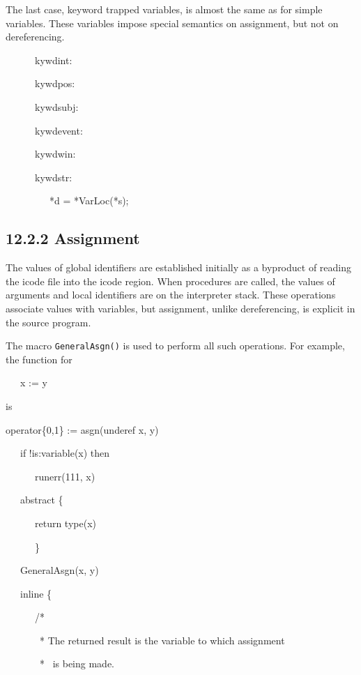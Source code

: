 The last case, keyword trapped variables, is almost the same as for
simple variables. These variables impose special semantics on
assignment, but not on dereferencing.

{\ttfamily\mdseries
\ \ \ \ \ \ kywdint:}

{\ttfamily\mdseries
\ \ \ \ \ \ kywdpos:}

{\ttfamily\mdseries
\ \ \ \ \ \ kywdsubj:}

{\ttfamily\mdseries
\ \ \ \ \ \ kywdevent:}

{\ttfamily\mdseries
\ \ \ \ \ \ kywdwin:}

{\ttfamily\mdseries
\ \ \ \ \ \ kywdstr:}


\ \ \ \ \ \ \ \ \ *d = *VarLoc(*s);

\subsection[12.2.2 Assignment]{12.2.2 Assignment}

The values of global identifiers are established initially as a
byproduct of reading the icode file into the icode region. When
procedures are called, the values of arguments and local identifiers
are on the interpreter stack. These operations associate values with
variables, but assignment, unlike dereferencing, is explicit in the
source program.


The macro \texttt{GeneralAsgn()} is used to perform all such
operations. For example, the function for

{\ttfamily\mdseries
\ \ \ x := y}

is

{\ttfamily\mdseries
operator\{0,1\} := asgn(underef x, y)}

{\ttfamily\mdseries
\ \ \ if !is:variable(x) then}

{\ttfamily\mdseries
\ \ \ \ \ \ runerr(111, x)}

{\ttfamily\mdseries
\ \ \ abstract \{}

{\ttfamily\mdseries
\ \ \ \ \ \ return type(x)}

{\ttfamily\mdseries
\ \ \ \ \ \ \}}

{\ttfamily\mdseries
\ \ \ GeneralAsgn(x, y)}

{\ttfamily\mdseries
\ \ \ inline \{}

{\ttfamily\mdseries
\ \ \ \ \ \ /*}

{\ttfamily\mdseries
\ \ \ \ \ \ \ * The returned result is the variable to which assignment }

{\ttfamily\mdseries
\ \ \ \ \ \ \ * \ is being made.}

